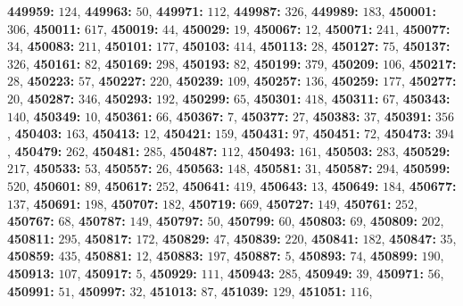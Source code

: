 \textsf{\bfseries 449959:} $124$, \textsf{\bfseries 449963:} $50$, \textsf{\bfseries 449971:} $112$, \textsf{\bfseries 449987:} $326$, \textsf{\bfseries 449989:} $183$, \textsf{\bfseries 450001:} $306$, \textsf{\bfseries 450011:} $617$, \textsf{\bfseries 450019:} $44$, \textsf{\bfseries 450029:} $19$, \textsf{\bfseries 450067:} $12$, \textsf{\bfseries 450071:} $241$, \textsf{\bfseries 450077:} $34$, \textsf{\bfseries 450083:} $211$, \textsf{\bfseries 450101:} $177$, \textsf{\bfseries 450103:} $414$, \textsf{\bfseries 450113:} $28$, \textsf{\bfseries 450127:} $75$, \textsf{\bfseries 450137:} $326$, \textsf{\bfseries 450161:} $82$, \textsf{\bfseries 450169:} $298$, \textsf{\bfseries 450193:} $82$, \textsf{\bfseries 450199:} $379$, \textsf{\bfseries 450209:} $106$, \textsf{\bfseries 450217:} $28$, \textsf{\bfseries 450223:} $57$, \textsf{\bfseries 450227:} $220$, \textsf{\bfseries 450239:} $109$, \textsf{\bfseries 450257:} $136$, \textsf{\bfseries 450259:} $177$, \textsf{\bfseries 450277:} $20$, \textsf{\bfseries 450287:} $346$, \textsf{\bfseries 450293:} $192$, \textsf{\bfseries 450299:} $65$, \textsf{\bfseries 450301:} $418$, \textsf{\bfseries 450311:} $67$, \textsf{\bfseries 450343:} $140$, \textsf{\bfseries 450349:} $10$, \textsf{\bfseries 450361:} $66$, \textsf{\bfseries 450367:} $7$, \textsf{\bfseries 450377:} $27$, \textsf{\bfseries 450383:} $37$, \textsf{\bfseries 450391:} $356$, \textsf{\bfseries 450403:} $163$, \textsf{\bfseries 450413:} $12$, \textsf{\bfseries 450421:} $159$, \textsf{\bfseries 450431:} $97$, \textsf{\bfseries 450451:} $72$, \textsf{\bfseries 450473:} $394$, \textsf{\bfseries 450479:} $262$, \textsf{\bfseries 450481:} $285$, \textsf{\bfseries 450487:} $112$, \textsf{\bfseries 450493:} $161$, \textsf{\bfseries 450503:} $283$, \textsf{\bfseries 450529:} $217$, \textsf{\bfseries 450533:} $53$, \textsf{\bfseries 450557:} $26$, \textsf{\bfseries 450563:} $148$, \textsf{\bfseries 450581:} $31$, \textsf{\bfseries 450587:} $294$, \textsf{\bfseries 450599:} $520$, \textsf{\bfseries 450601:} $89$, \textsf{\bfseries 450617:} $252$, \textsf{\bfseries 450641:} $419$, \textsf{\bfseries 450643:} $13$, \textsf{\bfseries 450649:} $184$, \textsf{\bfseries 450677:} $137$, \textsf{\bfseries 450691:} $198$, \textsf{\bfseries 450707:} $182$, \textsf{\bfseries 450719:} $669$, \textsf{\bfseries 450727:} $149$, \textsf{\bfseries 450761:} $252$, \textsf{\bfseries 450767:} $68$, \textsf{\bfseries 450787:} $149$, \textsf{\bfseries 450797:} $50$, \textsf{\bfseries 450799:} $60$, \textsf{\bfseries 450803:} $69$, \textsf{\bfseries 450809:} $202$, \textsf{\bfseries 450811:} $295$, \textsf{\bfseries 450817:} $172$, \textsf{\bfseries 450829:} $47$, \textsf{\bfseries 450839:} $220$, \textsf{\bfseries 450841:} $182$, \textsf{\bfseries 450847:} $35$, \textsf{\bfseries 450859:} $435$, \textsf{\bfseries 450881:} $12$, \textsf{\bfseries 450883:} $197$, \textsf{\bfseries 450887:} $5$, \textsf{\bfseries 450893:} $74$, \textsf{\bfseries 450899:} $190$, \textsf{\bfseries 450913:} $107$, \textsf{\bfseries 450917:} $5$, \textsf{\bfseries 450929:} $111$, \textsf{\bfseries 450943:} $285$, \textsf{\bfseries 450949:} $39$, \textsf{\bfseries 450971:} $56$, \textsf{\bfseries 450991:} $51$, \textsf{\bfseries 450997:} $32$, \textsf{\bfseries 451013:} $87$, \textsf{\bfseries 451039:} $129$, \textsf{\bfseries 451051:} $116$, 
